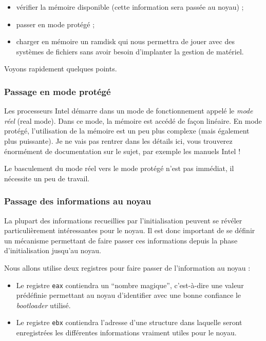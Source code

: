 \begin{itemize}
   \item vérifier la mémoire disponible (cette information sera passée au
     noyau) ; 
   \item passer en mode protégé ;
   \item charger en mémoire un ramdisk qui nous permettra de jouer avec
    des systèmes de fichiers  sans avoir besoin d'implanter la gestion
    de matériel.
\end{itemize}

   Voyons rapidement quelques points.

\subsubsection{Passage en mode protégé}

   Les processeurs Intel démarre dans un mode de fonctionnement appelé
le {\em mode réel} (real mode). Dans ce mode, la mémoire est accédé de
façon linéaire. En mode protégé, l'utilisation de la mémoire est un
peu plus complexe (mais également plus puissante). Je ne vais pas
rentrer dans les détails ici, vous trouverez énormément de
documentation sur le sujet, par exemple les manuels Intel !

   Le basculement du mode réel vers le mode protégé n'est pas
immédiat, il nécessite un peu de travail.
   
\subsubsection{Passage des informations au noyau}

   La plupart des informations recueillies par l'initialisation peuvent se
révéler particulièrement intéressantes pour le noyau. Il est donc important de
se définir un mécanisme permettant de faire passer ces informations depuis la
phase d'initialisation jusqu'au noyau.

   Nous allons utilise deux registres pour faire passer de
l'information au noyau :

\begin{itemize}
   \item Le registre \lstinline!eax! contiendra un ``nombre magique'',
     c'est-à-dire une valeur prédéfinie permettant au noyau
     d'identifier avec une bonne confiance le {\em bootloader}
     utilisé.
   \item Le registre \lstinline!ebx! contiendra l'adresse d'une
     structure dans laquelle seront enregistrées les différentes
     informations vraiment utiles pour le noyau.
\end{itemize}

